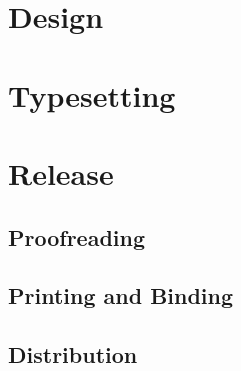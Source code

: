 \documentclass{book}
\begin{document}
\chapter{Design}
\chapter{Typesetting}
%
\chapter{Release}
\section{Proofreading}
\section{Printing and Binding}
\section{Distribution}

\cleardoublepage
\printbibliography[heading=bibintoc]

\cleardoublepage
{}
\printacronyms[heading=none]

\def\index#1{} %
\printindex    %
\end{document}
